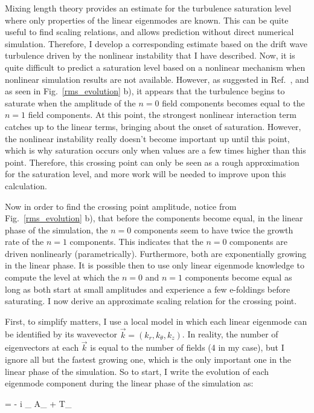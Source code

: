 Mixing length theory provides an estimate for the turbulence saturation level where only properties of the linear eigenmodes are known. This can be quite useful to find scaling relations, and allows
prediction without direct numerical simulation. Therefore, I develop a corresponding estimate based on the drift wave turbulence driven by the nonlinear instability that I have described.
Now, it is quite difficult to predict a saturation level based on a nonlinear mechanism when nonlinear simulation results are not available. However, as suggested in Ref.~\cite{cheng1978},
and as seen in Fig.~\ref{rms_evolution} b), it appears that the turbulence begins to saturate when the amplitude of the $n=0$ field components becomes equal to the $n=1$ field components.
At this point, the strongest nonlinear interaction term catches up to the linear terms, bringing about the onset of saturation. However, the nonlinear instability really doesn't become important
up until this point, which is why saturation occurs only when values are a few times higher than this point. Therefore, this crossing point can only be seen as a rough approximation for the
saturation level, and more work will be needed to improve upon this calculation.

Now in order to find the crossing point amplitude, notice from Fig.~\ref{rms_evolution} b), that before the components become equal, in the linear phase of the simulation,
the $n=0$ components seem to have twice the growth rate of the $n=1$ components. This indicates that the
$n=0$ components are driven nonlinearly (parametrically). Furthermore, both are exponentially growing in the linear phase. It is possible then to use only linear eigenmode knowledge
to compute the level at which the $n=0$ and $n=1$ components become equal as long as both start at small amplitudes and experience a few e-foldings before saturating. I now derive
an approximate scaling relation for the crossing point.

First, to simplify matters, I use a local model in which each linear eigenmode can be identified by its wavevector $\vec{k} = (k_r, k_\theta, k_z)$. In reality, the number of eigenvectors at each
$\vec{k}$ is equal to the number of fields (4 in my case), but I ignore all but the fastest growing one, which is the only important one in the linear phase of the simulation.
So to start, I write the evolution of each eigenmode component during the linear phase of the simulation as:

\beq
\label{eigenmode_evolution}
 = - i \omega_{} A_{} + T_{}
\eeq

